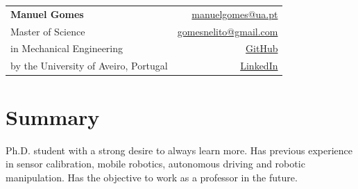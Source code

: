 \documentclass[a4paper,11pt]{article}
\makeatletter
\newcommand{\name}{Manuel Gomes} %
\newcommand{\academictitle}{Master of Science} %
\newcommand{\course}{Mechanical Engineering} %
\newcommand{\institution}{University of Aveiro, Portugal} %
\newcommand{\phone}{} %
\newcommand{\emaila}{manuelgomes@ua.pt} %
\newcommand{\emailb}{gomesnelito@gmail.com} %
\newcommand{\github}{manuelgitgomes} %
\newcommand{\linkedin}{mangomes} %
\makeatother
\begin{document}
\selectfont
\parbox{2.35cm}{%

}\parbox{\dimexpr\linewidth-2.8cm\relax}{
\begin{tabularx}{\linewidth}{L r}
  \textbf{\LARGE \name} & \href{mailto:\emaila}{\emaila}\\
  
  \academictitle &  \href{mailto:\emailb}{\emailb}\\
   {in \course} &  \href{https://github.com/\github}{GitHub} \\ %
  {by the \institution} & \href{https://www.linkedin.com/in/\linkedin/}{LinkedIn}

  
\end{tabularx}
}

\vspace{-2mm}
\section{\textbf{Summary}}
Ph.D. student with a strong desire to always learn more.
Has previous experience in sensor calibration, mobile robotics, autonomous driving and robotic manipulation.
Has the objective to work as a professor in the future.
\end{document}
